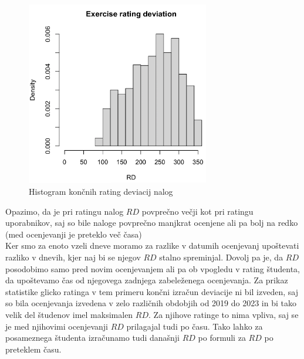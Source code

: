 \documentclass{IEEEtran}
\begin{document}
\begin{figure}[h!]
    \includegraphics[width=8cm]{RDExercise}
    \caption{Histogram končnih rating deviacij nalog}%
    \label{fig:example}%
\end{figure}

\newpage
Opazimo, da je pri ratingu nalog $RD$ povprečno večji kot pri ratingu uporabnikov, saj so bile naloge povprečno manjkrat ocenjene ali pa bolj na redko (med ocenjevanji je preteklo več časa)
\hfill
\\

Ker smo za enoto vzeli dneve moramo za razlike v datumih ocenjevanj upoštevati razliko v dnevih, kjer naj bi se njegov $RD$ stalno spreminjal. Dovolj pa je, da $RD$ posodobimo samo pred novim ocenjevanjem ali pa ob vpogledu v rating študenta, da upoštevamo čas od njegovega zadnjega zabeleženega ocenjevanja. Za prikaz statistike glicko ratinga v tem primeru končni izračun deviacije ni bil izveden, saj so bila ocenjevanja izvedena v zelo različnih obdobjih od 2019 do 2023 in bi tako velik del študenov imel maksimalen $RD$. Za njihove ratinge to nima vpliva, saj se je med njihovimi ocenjevanji $RD$ prilagajal tudi po času. Tako lahko za posameznega študenta izračunamo tudi današnji $RD$ po formuli za $RD$ po preteklem času. %

\newpage
\end{document}
